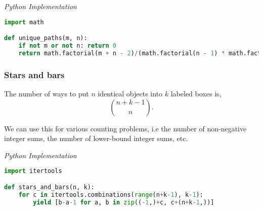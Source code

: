 \documentclass{article}
\begin{document}
\vspace{8pt} \emph{Python Implementation}
\begin{lstlisting}[language=Python]
import math

def unique_paths(m, n):
    if not m or not n: return 0
    return math.factorial(m + n - 2)/(math.factorial(n - 1) * math.factorial(m - 1))
\end{lstlisting}

    \subsubsection{Stars and bars}

    The number of ways to put $n$ identical objects into $k$ labeled boxes is,
    \[
    \binom{n+k-1}{n}.
    \]
    
    We can use this for various counting problems, i.e the number of non-negative integer sums, the number of lower-bound integer sums, etc.
    
\vspace{8pt} \emph{Python Implementation}
\begin{lstlisting}[language=Python]
import itertools

def stars_and_bars(n, k):
    for c in itertools.combinations(range(n+k-1), k-1):
        yield [b-a-1 for a, b in zip((-1,)+c, c+(n+k-1,))]

\end{lstlisting}

    
    
    
\end{document}
